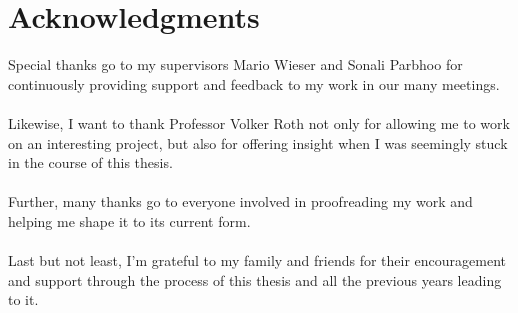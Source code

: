 \chapter{Acknowledgments}
Special thanks go to my supervisors Mario Wieser and Sonali Parbhoo 
for continuously providing support and feedback to my work in our many meetings.
\\
\\
Likewise, I want to thank Professor Volker Roth not only for allowing me to work on an interesting project,
but also for offering insight when I was seemingly stuck in the course of this thesis.
\\\\
Further, many thanks go to everyone involved in proofreading my work and helping me shape it to its current form.
\\
\\
Last but not least, I'm grateful to my family and friends for their encouragement and support through the process of this thesis and all the previous years leading to it.